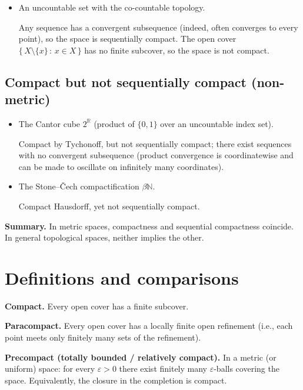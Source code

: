 \documentclass[12pt,a4paper]{article}
\theoremstyle{plain}
\theoremstyle{definition}
\theoremstyle{remark}
\theoremstyle{remark}
\begin{document}
\begin{itemize}
\item An uncountable set with the co-countable topology.

Any sequence has a convergent subsequence (indeed, often converges to every point), so the space is sequentially compact.
The open cover \(\{\,X\setminus\{x\}\,:\,x\in X\,\}\) has no finite subcover, so the space is not compact.
\end{itemize}

\smallskip

\subsection*{Compact but not sequentially compact (non-metric)}

\begin{itemize}
\item The Cantor cube \(2^{\mathbb{R}}\) (product of \(\{0,1\}\) over an uncountable index set).

Compact by Tychonoff, but not sequentially compact; there exist sequences with no convergent subsequence (product convergence is coordinatewise and can be made to oscillate on infinitely many coordinates).

\item The Stone--Čech compactification \(\beta\mathbb{N}\).

Compact Hausdorff, yet not sequentially compact.
\end{itemize}

\medskip

\noindent\textbf{Summary.}
In metric spaces, compactness and sequential compactness coincide. In general topological spaces, neither implies the other.


\section*{Definitions and comparisons}

\noindent\textbf{Compact.}
Every open cover has a finite subcover.

\smallskip

\noindent\textbf{Paracompact.}
Every open cover has a locally finite open refinement
(i.e., each point meets only finitely many sets of the refinement).

\smallskip

\noindent\textbf{Precompact (totally bounded / relatively compact).}
In a metric (or uniform) space: for every \(\varepsilon>0\) there exist finitely many
\(\varepsilon\)-balls covering the space.
Equivalently, the closure in the completion is compact.
\end{document}
